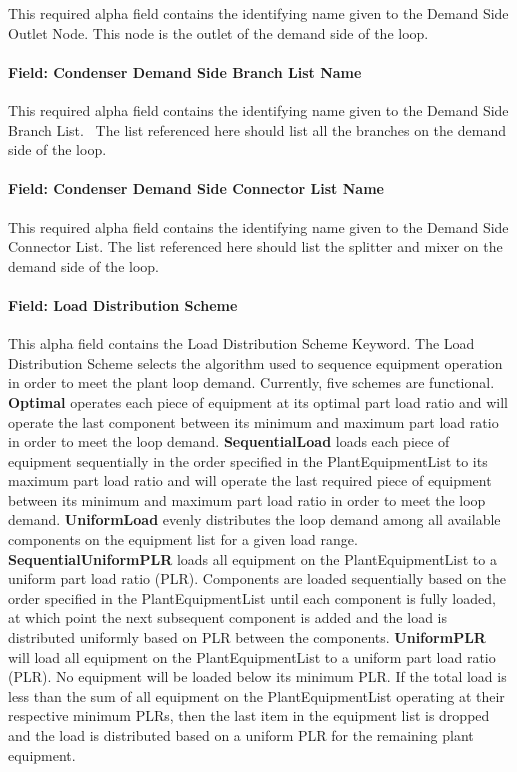 This required alpha field contains the identifying name given to the Demand Side Outlet Node. This node is the outlet of the demand side of the loop.

\paragraph{Field: Condenser Demand Side Branch List Name}\label{field-condenser-demand-side-branch-list-name}

This required alpha field contains the identifying name given to the Demand Side Branch List.~ The list referenced here should list all the branches on the demand side of the loop.

\paragraph{Field: Condenser Demand Side Connector List Name}\label{field-condenser-demand-side-connector-list-name}

This required alpha field contains the identifying name given to the Demand Side Connector List. The list referenced here should list the splitter and mixer on the demand side of the loop.

\paragraph{Field: Load Distribution Scheme}\label{field-load-distribution-scheme-1-000}

This alpha field contains the Load Distribution Scheme Keyword. The Load Distribution Scheme selects the algorithm used to sequence equipment operation in order to meet the plant loop demand. Currently, five schemes are functional. \textbf{Optimal} operates each piece of equipment at its optimal part load ratio and will operate the last component between its minimum and maximum part load ratio in order to meet the loop demand. \textbf{SequentialLoad} loads each piece of equipment sequentially in the order specified in the PlantEquipmentList to its maximum part load ratio and will operate the last required piece of equipment between its minimum and maximum part load ratio in order to meet the loop demand. \textbf{UniformLoad} evenly distributes the loop demand among all available components on the equipment list for a given load range. \textbf{SequentialUniformPLR} loads all equipment on the PlantEquipmentList to a uniform part load ratio (PLR). Components are loaded sequentially based on the order specified in the PlantEquipmentList until each component is fully loaded, at which point the next subsequent component is added and the load is distributed uniformly based on PLR between the components. \textbf{UniformPLR} will load all equipment on the PlantEquipmentList to a uniform part load ratio (PLR). No equipment will be loaded below its minimum PLR. If the total load is less than the sum of all equipment on the PlantEquipmentList operating at their respective minimum PLRs, then the last item in the equipment list is dropped and the load is distributed based on a uniform PLR for the remaining plant equipment.


